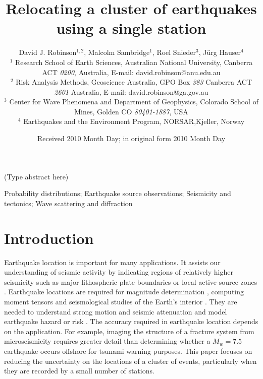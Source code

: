 \documentclass[extra]{gji}
\title{Relocating a cluster of earthquakes using a single station}
\author[D.J. Robinson, M. Sambridge, R. Snieder and J Hauser]
  {David J. Robinson$^{1,2}$, Malcolm Sambridge$^{1}$, Roel Snieder$^{3}$, J\"urg Hauser$^{4}$ \\
  $^1$ Research School of Earth Sciences, Australian National
    University, Canberra ACT \emph{0200}, Australia, E-mail: david.robinson@anu.edu.au \\
$^2$  Risk Analysis Methods, Geoscience Australia, GPO Box \emph{383} Canberra ACT \emph{2601} Australia, E-mail: david.robinson@ga.gov.au\\
$^3$ Center for Wave Phenomena and Department of Geophysics, Colorado School of Mines, Golden CO \emph{80401-1887}, USA \\
$^4$ Earthquakes and the Environment Program, NORSAR,Kjeller, Norway}
\date{Received 2010 Month Day; in original form 2010 Month Day}
\begin{document}
\label{firstpage}

\maketitle


\begin{summary}
(Type abstract here)
\end{summary}

\begin{keywords}
 Probability distributions; Earthquake source observations; Seismicity and tectonics; Wave scattering and diffraction
\end{keywords}

\section{Introduction}

Earthquake location is important for many applications. It assists
our understanding of seismic activity by indicating regions of
relatively higher seismicity such as major lithospheric plate
boundaries \citep[e.g., ][]{dr_Sykes67a, dr_Isacks68a,
dr_Stein02a} or local active source zones
\citep[e.g., ][]{dr_Gutenberg44a, dr_Giardini03a}.
Earthquake locations are required for  magnitude determination
\citep[e.g., ][]{dr_Richter35a, dr_Gutenberg45a}, computing
moment tensors \citep[e.g., ][]{dr_Sipkin02a} and
seismological studies of the Earth's interior
\citep[e.g., ][]{dr_Spencer80a, dr_Kennett95a, dr_Curtis02a,
dr_Kennett04a}. They are needed to
understand strong motion and seismic attenuation
\citep[e.g., ][]{dr_Toro97a, dr_Campbell03a}
 and model earthquake hazard or risk
\citep[e.g., ][]{dr_Frankel00a, dr_Stirling02a, dr_Robinson06b}.
The accuracy required in earthquake location depends on the application.
For example, imaging the structure of a fracture system from microseismicity
requires greater detail than determining whether a $M_w=7.5$ earthquake
occurs offshore for tsunami warning purposes. This paper focuses
on reducing the uncertainty on the locations of a cluster of events, particularly
when they are recorded by a small number of stations.
\end{document}
